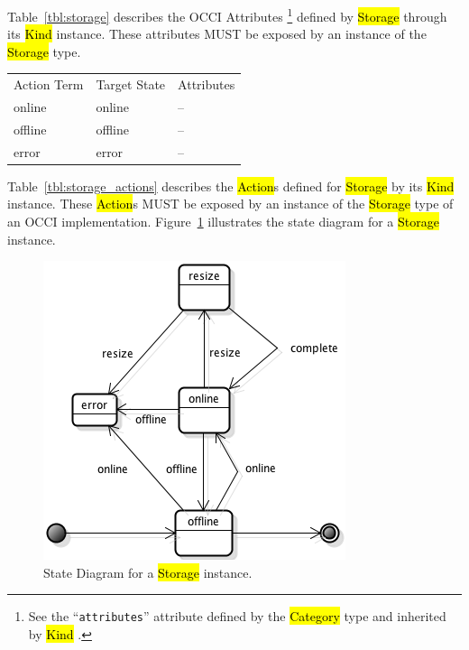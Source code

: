 \documentclass[10pt,a4paper]{article}
\begin{document}
Table~\ref{tbl:storage} describes the OCCI Attributes%
\footnote{See the ``{\tt attributes}'' attribute defined by the
  \hl{Category} type and inherited by \hl{Kind} \cite{occi:core}.}
defined by \hl{Storage} through its \hl{Kind} instance. These
attributes MUST be exposed by an instance of the \hl{Storage} type.

{
	\begin{tabular}{lll}
	\toprule
	Action Term&Target State&Attributes\\
	\colrule
	online & online & --\\
	offline & offline & --\\
	error & error & --\\
	\end{tabular}
}

Table~\ref{tbl:storage_actions} describes the \hl{Action}s defined for
\hl{Storage} by its \hl{Kind} instance. These \hl{Action}s MUST be
exposed by an instance of the \hl{Storage} type of an OCCI
implementation.  Figure~\ref{fig:storage_state} illustrates the state
diagram for a \hl{Storage} instance.

\begin{figure}[!h]
	\centering
	\includegraphics[scale=0.4]{figs/storage-state.png}
	\caption{State Diagram for a \hl{Storage} instance.}
	\label{fig:storage_state}
\end{figure}
\end{document}
